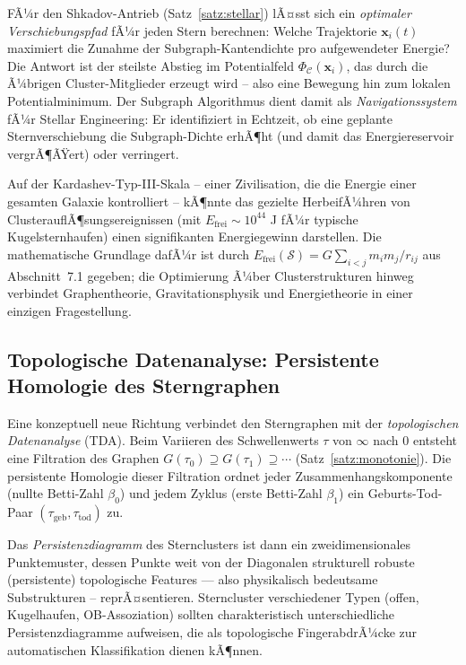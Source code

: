 ﻿\documentclass[a4paper,12pt]{report}
\theoremstyle{definition}
\begin{document}
FÃ¼r den Shkadov-Antrieb (Satz~\ref{satz:stellar}) lÃ¤sst sich ein \emph{optimaler Verschiebungspfad} fÃ¼r jeden Stern berechnen: Welche Trajektorie $\mathbf{x}_i(t)$ maximiert die Zunahme der Subgraph-Kantendichte pro aufgewendeter Energie? Die Antwort ist der steilste Abstieg im Potentialfeld $\Phi_\mathcal{C}(\mathbf{x}_i)$, das durch die Ã¼brigen Cluster-Mitglieder erzeugt wird -- also eine Bewegung hin zum lokalen Potentialminimum. Der Subgraph Algorithmus dient damit als \emph{Navigationssystem} fÃ¼r Stellar Engineering: Er identifiziert in Echtzeit, ob eine geplante Sternverschiebung die Subgraph-Dichte erhÃ¶ht (und damit das Energiereservoir vergrÃ¶ÃŸert) oder verringert.

Auf der Kardashev-Typ-III-Skala -- einer Zivilisation, die die Energie einer gesamten Galaxie kontrolliert -- kÃ¶nnte das gezielte HerbeifÃ¼hren von ClusterauflÃ¶sungsereignissen (mit $E_\mathrm{frei} \sim 10^{44}$ J fÃ¼r typische Kugelsternhaufen) einen signifikanten Energiegewinn darstellen. Die mathematische Grundlage dafÃ¼r ist durch $E_\mathrm{frei}(\mathcal{S}) = G \sum_{i<j} m_i m_j / r_{ij}$ aus Abschnitt~7.1 gegeben; die Optimierung Ã¼ber Clusterstrukturen hinweg verbindet Graphentheorie, Gravitationsphysik und Energietheorie in einer einzigen Fragestellung.

\subsection{Topologische Datenanalyse: Persistente Homologie des Sterngraphen}

Eine konzeptuell neue Richtung verbindet den Sterngraphen mit der \emph{topologischen Datenanalyse} (TDA). Beim Variieren des Schwellenwerts $\tau$ von $\infty$ nach $0$ entsteht eine Filtration des Graphen $G(\tau_0) \supseteq G(\tau_1) \supseteq \cdots$ (Satz~\ref{satz:monotonie}). Die persistente Homologie dieser Filtration ordnet jeder Zusammenhangskomponente (nullte Betti-Zahl $\beta_0$) und jedem Zyklus (erste Betti-Zahl $\beta_1$) ein Geburts-Tod-Paar $(\tau_\mathrm{geb}, \tau_\mathrm{tod})$ zu.

Das \emph{Persistenzdiagramm} des Sternclusters ist dann ein zweidimensionales Punktemuster, dessen Punkte weit von der Diagonalen strukturell robuste (persistente) topologische Features --- also physikalisch bedeutsame Substrukturen -- reprÃ¤sentieren. Sterncluster verschiedener Typen (offen, Kugelhaufen, OB-Assoziation) sollten charakteristisch unterschiedliche Persistenzdiagramme aufweisen, die als topologische FingerabdrÃ¼cke zur automatischen Klassifikation dienen kÃ¶nnen.
\end{document}
